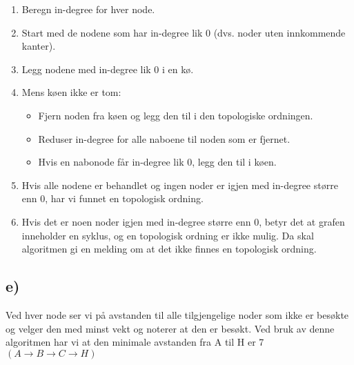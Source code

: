 \documentclass[12pt]{article}
\begin{document}
\begin{enumerate}
    \item Beregn in-degree for hver node.
    \item Start med de nodene som har in-degree lik 0 (dvs. noder uten innkommende kanter).
    \item Legg nodene med in-degree lik 0 i en kø.
    \item Mens køen ikke er tom:
    \begin{itemize}
        \item Fjern noden fra køen og legg den til i den topologiske ordningen.
        \item Reduser in-degree for alle naboene til noden som er fjernet.
        \item Hvis en nabonode får in-degree lik 0, legg den til i køen.
    \end{itemize}
    \item Hvis alle nodene er behandlet og ingen noder er igjen med in-degree større enn 0, har vi funnet en topologisk ordning.
    \item Hvis det er noen noder igjen med in-degree større enn 0, betyr det at grafen inneholder en syklus, og en topologisk ordning er ikke mulig. Da skal algoritmen gi en melding om at det ikke finnes en topologisk ordning.
\end{enumerate}

\break
\subsection*{e)}
Ved hver node ser vi på avstanden til alle tilgjengelige noder som ikke er besøkte 
og velger den med minst vekt og noterer at den er besøkt. 
Ved bruk av denne algoritmen har vi at den minimale avstanden fra 
A til H er 7 \(\left(A\to B \to C \to H\right)\)
\end{document}
